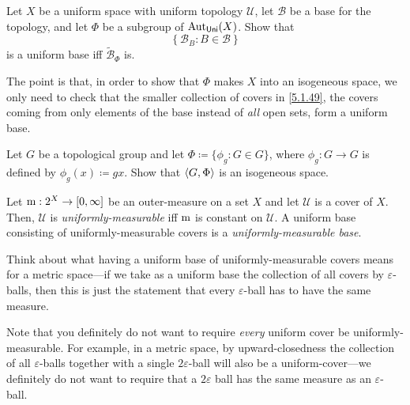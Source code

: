\begin{exr}\label{exr5.1.48}
Let $X$ be a uniform space with uniform topology $\mathcal{U}$, let $\mathcal{B}$ be a base for the topology, and let $\Phi$ be a subgroup of $\operatorname{Aut} _{\mathsf{Uni}}(X)$.  Show that
\begin{equation}\label{5.1.49}
\left\{ \mathcal{B}_B:B\in \mathcal{B}\right\}
\end{equation}
is a uniform base iff $\widetilde{\mathcal{B}}_\Phi$ is.
\begin{rmk}
The point is that, in order to show that $\Phi$ makes $X$ into an isogeneous space, we only need to check that the smaller collection of covers in \eqref{5.1.49}, the covers coming from only elements of the base instead of \emph{all} open sets, form a uniform base.
\end{rmk}
\end{exr}
\begin{exr}
Let $G$ be a topological group and let $\Phi \coloneqq \{ \phi _g:G\in G\}$, where $\phi _g:G\rightarrow G$ is defined by $\phi _g(x)\coloneqq gx$.  Show that $\langle G,\Phi\rangle$ is an isogeneous space.
\end{exr}
\begin{dfn}\label{UniformlyMeasurable}
Let $\mathrm{m} :2^X\rightarrow [0,\infty ]$ be an outer-measure on a set $X$ and let $\mathcal{U}$ is a cover of $X$.  Then, $\mathcal{U}$ is \emph{uniformly-measurable} iff $\mathrm{m}$ is constant on $\mathcal{U}$.  A uniform base consisting of uniformly-measurable covers is a \emph{uniformly-measurable base}.
\begin{rmk}
Think about what having a uniform base of uniformly-measurable covers means for a metric space---if we take as a uniform base the collection of all covers by $\varepsilon$-balls, then this is just the statement that every $\varepsilon$-ball has to have the same measure.
\end{rmk}
\begin{rmk}
Note that you definitely do not want to require \emph{every} uniform cover be uniformly-measurable.  For example, in a metric space, by upward-closedness the collection of all $\varepsilon$-balls together with a single $2\varepsilon$-ball will also be a uniform-cover---we definitely do not want to require that a $2\varepsilon$ ball has the same measure as an $\varepsilon$-ball.
\end{rmk}
\end{dfn}
